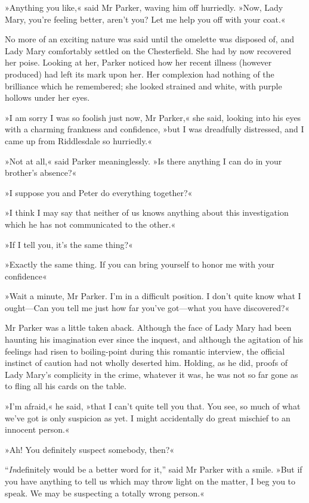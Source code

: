 »Anything you like,« said Mr Parker, waving him off hurriedly. »Now, Lady Mary, you're feeling better, aren't you? Let me help you off with your coat.«

No more of an exciting nature was said until the omelette was disposed of, and Lady Mary comfortably settled on the Chesterfield. She had by now recovered her poise. Looking at her, Parker noticed how her recent illness (however produced) had left its mark upon her. Her complexion had nothing of the brilliance which he remembered; she looked strained and white, with purple hollows under her eyes.

»I am sorry I was so foolish just now, Mr Parker,« she said, looking into his eyes with a charming frankness and confidence, »but I was dreadfully distressed, and I came up from Riddlesdale so hurriedly.«

»Not at all,« said Parker meaninglessly. »Is there anything I can do in your brother's absence?«

»I suppose you and Peter do everything together?«

»I think I may say that neither of us knows anything about this investigation which he has not communicated to the other.«

»If I tell you, it's the same thing?«

»Exactly the same thing. If you can bring yourself to honor me with your confidence\longdash«

»Wait a minute, Mr Parker. I'm in a difficult position. I don't quite know what I ought\allowbreak---\allowbreak Can you tell me just how far you've got\allowbreak---\allowbreak what you have discovered?«

Mr Parker was a little taken aback. Although the face of Lady Mary had been haunting his imagination ever since the inquest, and although the agitation of his feelings had risen to boiling-point during this romantic interview, the official instinct of caution had not wholly deserted him. Holding, as he did, proofs of Lady Mary's complicity in the crime, whatever it was, he was not so far gone as to fling all his cards on the table.

»I'm afraid,« he said, »that I can't quite tell you that. You see, so much of what we've got is only suspicion as yet. I might accidentally do great mischief to an innocent person.«

»Ah! You definitely suspect somebody, then?«

\enquote{\textit{In}definitely would be a better word for it,} said Mr Parker with a smile. »But if you have anything to tell us which may throw light on the matter, I beg you to speak. We may be suspecting a totally wrong person.«

